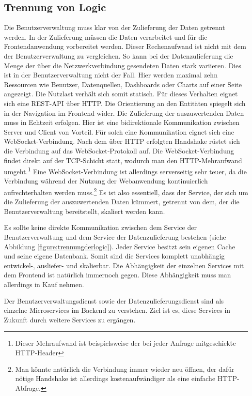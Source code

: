 \subsection{Trennung von Logic}
\label{subsec:trennungvonlogic}
Die Benutzerverwaltung muss klar von der Zulieferung der Daten getrennt werden.
In der Zulieferung müssen die Daten verarbeitet und für die Frontendanwendung
vorbereitet werden. Dieser Rechenaufwand ist nicht mit dem der Benutzerverwaltung
zu vergleichen. So kann bei der Datenzulieferung die Menge der über die Netzwerkverbindung
gesendeten Daten stark variieren. Dies ist in der Benutzerverwaltung nicht der Fall. 
Hier werden maximal zehn Ressourcen wie Benutzer, Datenquellen, Dashboards oder Charts
auf einer Seite angezeigt. Die Nutzlast verhält sich somit statisch. Für dieses Verhalten
eignet sich eine REST-API über HTTP. Die Orientierung an den Entitäten spiegelt sich in der Navigation
im Frontend wider. Die Zulieferung der auszuwertenden Daten muss in Echtzeit erfolgen.
Hier ist eine bidirektionale Kommunikation zwischen Server und Client von Vorteil.
Für solch eine Kommunikation eignet sich eine WebSocket-Verbindung. Nach dem über HTTP erfolgten
Handshake rüstet sich die Verbindung auf das WebSocket-Protokoll auf. Die WebSocket-Verbindung
findet direkt auf der TCP-Schicht statt, wodurch man den HTTP-Mehraufwand umgeht.\footnote{Dieser Mehraufwand ist beispielsweise der bei jeder Anfrage mitgeschickte HTTP-Header}
Eine WebSocket-Verbindung ist allerdings serverseitig sehr teuer, da die Verbindung während der Nutzung
der Webanwendung kontinuierlich aufrechterhalten werden muss.\footnote{Man könnte natürlich die Verbindung immer wieder neu öffnen, der dafür nötige Handshake ist allerdings kostenaufwändiger als eine einfache HTTP-Abfrage.} 
Es ist also essentiell, dass der Service, der sich um die Zulieferung der auszuwertenden Daten kümmert,
getrennt von dem, der die Benutzerverwaltung bereitstellt, skaliert werden kann.

Es sollte keine direkte Kommunikation zwischen dem Service der Benutzerverwaltung und dem
Service der Datenzulieferung bestehen (siehe Abbildung \ref{figure:trennungderlogic}).
Jeder Service besitzt sein eigenen Cache und seine eigene Datenbank. Somit sind
die Services komplett unabhängig entwickel-, ausliefer- und skalierbar. Die Abhängigkeit der einzelnen
Services mit dem Frontend ist natürlich immernoch gegen. Diese Abhängigkeit muss man
allerdings in Kauf nehmen.

Der Benutzerverwaltungsdienst sowie der Datenzulieferungsdienst sind als einzelne Microservices
im Backend zu verstehen. Ziel ist es, diese Services in Zukunft durch weitere Services zu ergängen.

